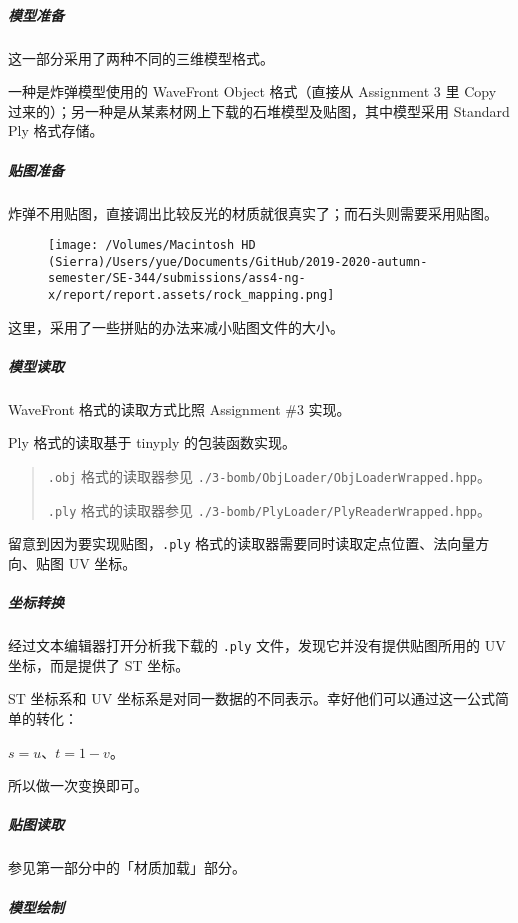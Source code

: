 \documentclass[
]{article}
\begin{document}
\hypertarget{header-n208}{%
\subparagraph{模型准备}\label{header-n208}}

这一部分采用了两种不同的三维模型格式。

一种是炸弹模型使用的 WaveFront Object 格式（直接从 Assignment 3 里 Copy
过来的）；另一种是从某素材网上下载的石堆模型及贴图，其中模型采用
Standard Ply 格式存储。

\hypertarget{header-n211}{%
\subparagraph{贴图准备}\label{header-n211}}

炸弹不用贴图，直接调出比较反光的材质就很真实了；而石头则需要采用贴图。

\begin{figure}
\centering
\texttt{[image: /Volumes/Macintosh HD (Sierra)/Users/yue/Documents/GitHub/2019-2020-autumn-semester/SE-344/submissions/ass4-ng-x/report/report.assets/rock\_mapping.png]}
\caption{}
\end{figure}

这里，采用了一些拼贴的办法来减小贴图文件的大小。

\hypertarget{header-n215}{%
\subparagraph{模型读取}\label{header-n215}}

WaveFront 格式的读取方式比照 Assignment \#3 实现。

Ply 格式的读取基于 tinyply 的包装函数实现。

\begin{quote}
\texttt{.obj} 格式的读取器参见
\texttt{./3-bomb/ObjLoader/ObjLoaderWrapped.hpp}。

\texttt{.ply} 格式的读取器参见
\texttt{./3-bomb/PlyLoader/PlyReaderWrapped.hpp}。
\end{quote}

留意到因为要实现贴图，\texttt{.ply}
格式的读取器需要同时读取定点位置、法向量方向、贴图 UV 坐标。

\hypertarget{header-n222}{%
\subparagraph{坐标转换}\label{header-n222}}

经过文本编辑器打开分析我下载的 \texttt{.ply}
文件，发现它并没有提供贴图所用的 UV 坐标，而是提供了 ST 坐标。

ST 坐标系和 UV
坐标系是对同一数据的不同表示。幸好他们可以通过这一公式简单的转化：

\(s = u\)、\(t = 1 - v\)。

所以做一次变换即可。

\hypertarget{header-n227}{%
\subparagraph{贴图读取}\label{header-n227}}

参见第一部分中的「材质加载」部分。

\hypertarget{header-n229}{%
\subparagraph{模型绘制}\label{header-n229}}
\end{document}
